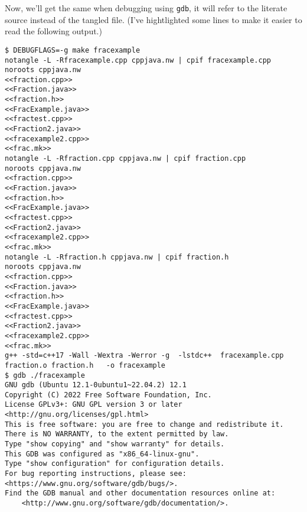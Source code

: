 Now, we'll get the same when debugging using \texttt{gdb}, it will refer to the 
literate source instead of the tangled file.
(I've hightlighted some lines to make it easier to read the following output.)
\begin{verbatim}
$ DEBUGFLAGS=-g make fracexample
notangle -L -Rfracexample.cpp cppjava.nw | cpif fracexample.cpp
noroots cppjava.nw
<<fraction.cpp>>
<<Fraction.java>>
<<fraction.h>>
<<FracExample.java>>
<<fractest.cpp>>
<<Fraction2.java>>
<<fracexample2.cpp>>
<<frac.mk>>
notangle -L -Rfraction.cpp cppjava.nw | cpif fraction.cpp
noroots cppjava.nw
<<fraction.cpp>>
<<Fraction.java>>
<<fraction.h>>
<<FracExample.java>>
<<fractest.cpp>>
<<Fraction2.java>>
<<fracexample2.cpp>>
<<frac.mk>>
notangle -L -Rfraction.h cppjava.nw | cpif fraction.h
noroots cppjava.nw
<<fraction.cpp>>
<<Fraction.java>>
<<fraction.h>>
<<FracExample.java>>
<<fractest.cpp>>
<<Fraction2.java>>
<<fracexample2.cpp>>
<<frac.mk>>
g++ -std=c++17 -Wall -Wextra -Werror -g  -lstdc++  fracexample.cpp fraction.o fraction.h   -o fracexample
$ gdb ./fracexample 
GNU gdb (Ubuntu 12.1-0ubuntu1~22.04.2) 12.1
Copyright (C) 2022 Free Software Foundation, Inc.
License GPLv3+: GNU GPL version 3 or later <http://gnu.org/licenses/gpl.html>
This is free software: you are free to change and redistribute it.
There is NO WARRANTY, to the extent permitted by law.
Type "show copying" and "show warranty" for details.
This GDB was configured as "x86_64-linux-gnu".
Type "show configuration" for configuration details.
For bug reporting instructions, please see:
<https://www.gnu.org/software/gdb/bugs/>.
Find the GDB manual and other documentation resources online at:
    <http://www.gnu.org/software/gdb/documentation/>.


\end{verbatim}
